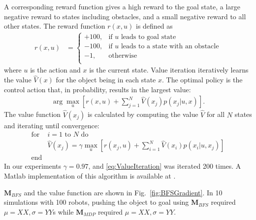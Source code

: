  A corresponding reward function gives a high reward to the goal state,  
 a large negative reward to states including obstacles, and a small negative reward to all other states.
The reward function $r(x,u)$ is defined as
\begin{align}
r(x,u) &=  \left\{
\begin{array}{ll}
     +100, &  \textrm{if } u \textrm{ leads to goal state}\\
      -100, & \textrm{if } u \textrm{ leads to a state with an obstacle} \\
      -1, & \textrm{otherwise}\\
\end{array} 
\right.
\end{align}
where $u$ is the action and $x$ is the current state. 
  Value iteration iteratively learns the value $\hat{V}(x)$ for the object being in each state $x$. The optimal policy is the control action that, in probability, results in the largest value:
   \begin{align} \arg\max_u   [ r(x,u) + \sum\limits_{j=1}^N \hat{V}(x_j) p(x_j| u,x)].  \label{eq:OptimalPolicy}
   \end{align}
   The value function $\hat{V}(x_j) $ is calculated by computing the value $\hat{V}$ for all $N$ states and iterating until convergence:
\begin{align}
\text{for }&\text{$i=1$ to $N$ do} \nonumber \\
&\hat{V} (x_j) = \gamma \max_u [r(x_j,u) + \sum\limits_{i=1}^N \hat{V}(x_i) p(x_i| u,x_j)] \label{eq:ValueIteration}\\
\text{end}& \nonumber
\end{align}
In our experiments $\gamma = 0.97$, and \eqref{eq:ValueIteration} was iterated 200 times. A {\sc Matlab} implementation of this algorithm is available at .  

$\mathbf{M}_{BFS}$ and the value function are shown in Fig.~\ref{fig:BFSGradient}. 
In 10 simulations with 100 robots, pushing the object to goal using $\mathbf{M}_{BFS}$ required $\mu=XX, \sigma=YY$s while  $\mathbf{M}_{MDP}$ required $\mu=XX, \sigma=YY$.

